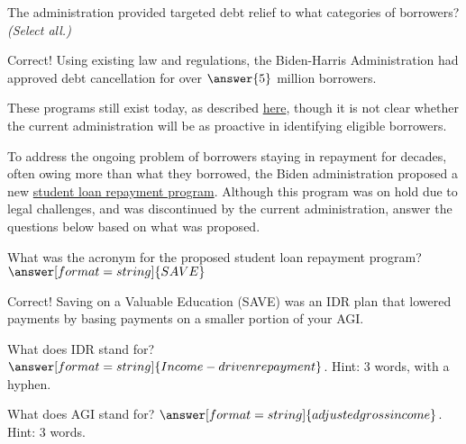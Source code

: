 \documentclass[handout,space,nooutcomes]{ximera}
\begin{document}
\begin{question}
The administration provided targeted debt relief to what categories of borrowers?  \emph{(Select all.)}
\begin{selectAll}
\end{selectAll}
\begin{question}
Correct!  Using existing law and regulations, the Biden-Harris Administration had approved debt cancellation for over $\answer{5}$ million borrowers.  

These programs still exist today, as described \href{https://studentaid.gov/manage-loans/forgiveness-cancellation}{here}, though it is not clear whether the current administration will be as proactive in identifying eligible borrowers.  


To address the ongoing problem of borrowers staying in repayment for decades, often owing more than what they borrowed, the Biden administration proposed a new \href{https://bidenwhitehouse.archives.gov/briefing-room/statements-releases/2023/08/22/fact-sheet-the-biden-harris-administration-launches-the-save-plan-the-most-affordable-student-loan-repayment-plan-ever-to-lower-monthly-payments-for-millions-of-borrowers/}{student loan repayment program}.  Although this program was on hold due to legal challenges, and was discontinued by the current administration, 
answer the questions below based on what was proposed.  

\begin{question}
What was the acronym for the proposed student loan repayment program?  $\answer[format=string]{SAVE}$
\begin{question}
Correct!  Saving on a Valuable Education (SAVE) was an IDR plan that lowered payments by basing payments on a smaller portion of your AGI.  

What does IDR stand for?  $\answer[format=string]{Income-driven repayment}$.  Hint: 3 words, with a hyphen. 

What does AGI stand for?  $\answer[format=string]{adjusted gross income}$. Hint: 3 words. 


\end{question}
\end{question}
\end{question}
\end{question}
\end{document}
